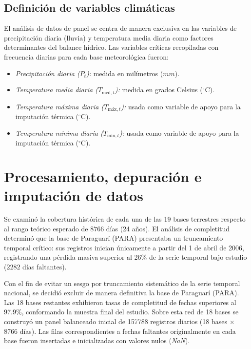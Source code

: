 \subsection{Definición de variables climáticas}

El análisis de datos de panel se centra de manera exclusiva en las variables de precipitación diaria (lluvia) y temperatura media diaria como factores determinantes del balance hídrico. Las variables críticas recopiladas con frecuencia diarias para cada base meteorológica fueron:
\begin{itemize}
    \item \textit{Precipitación diaria ($P_t$):} medida en milímetros ($mm$).
    \item \textit{Temperatura media diaria ($T_{\text{med}, t}$):} medida en grados Celsius ($^{\circ}\text{C}$).
    \item \textit{Temperatura máxima diaria ($T_{\text{máx}, t}$):} usada como variable de apoyo para la imputación térmica ($^{\circ}\text{C}$).
    \item \textit{Temperatura mínima diaria ($T_{\text{mín}, t}$):} usada como variable de apoyo para la imputación térmica ($^{\circ}\text{C}$).
\end{itemize}

\section{Procesamiento, depuración e imputación de datos}

Se examinó la cobertura histórica de cada una de las 19 bases terrestres respecto al rango teórico esperado de $8766$ días (24 años). El análisis de completitud determinó que la base de Paraguarí (PARA) presentaba un truncamiento temporal crítico: sus registros inician únicamente a partir del 1 de abril de 2006, registrando una pérdida masiva superior al 26\% de la serie temporal bajo estudio ($2282$ días faltantes). 

Con el fin de evitar un sesgo por truncamiento sistemático de la serie temporal nacional, se decidió excluir de manera definitiva la base de Paraguarí (PARA). Las 18 bases restantes exhibieron tasas de completitud de fechas superiores al 97.9\%, conformando la muestra final del estudio. Sobre esta red de 18 bases se construyó un panel balanceado inicial de 157788 registros diarios (18 bases $\times$ 8766 días). Las filas correspondientes a fechas faltantes originalmente en cada base fueron insertadas e inicializadas con valores nulos (\textit{NaN}).


